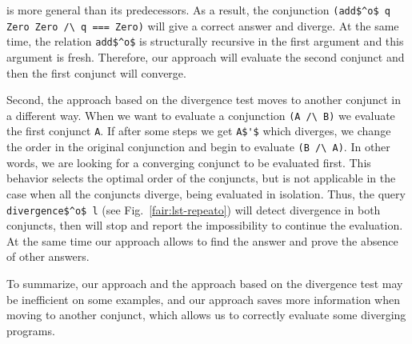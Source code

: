 is more general than its predecessors. As a result, the conjunction \linebreak \lstinline{(add$^o$ q Zero Zero /\ q === Zero)} will give a correct answer and diverge. At the same time,
the relation \lstinline{add$^o$} is structurally recursive in the first argument and this argument is fresh. Therefore, our approach will evaluate the second conjunct and then
the first conjunct will converge.

Second, the approach based on the divergence test moves to another conjunct in a different way. When we want to evaluate a conjunction \lstinline{(A /\ B)} we evaluate the first
conjunct \lstinline{A}. If after some steps we get \lstinline{A$'$} which diverges, we change the order in the original conjunction and begin to evaluate \lstinline{(B /\ A)}.
In other words, we are looking for a converging conjunct to be evaluated first. This behavior selects the optimal order of the conjuncts, but is not applicable in the case when
all the conjuncts diverge, being evaluated in isolation. Thus, the query \lstinline{divergence$^o$ l} (see Fig.~\ref{fair:lst-repeato}) will detect divergence in both conjuncts,
then will stop and report the impossibility to continue the evaluation. At the same time our approach allows to find the answer and prove the absence of other answers.

To summarize, our approach and the approach based on the divergence test may be inefficient on some examples, and our approach saves more information when moving to another conjunct,
which allows us to correctly evaluate some diverging programs.

